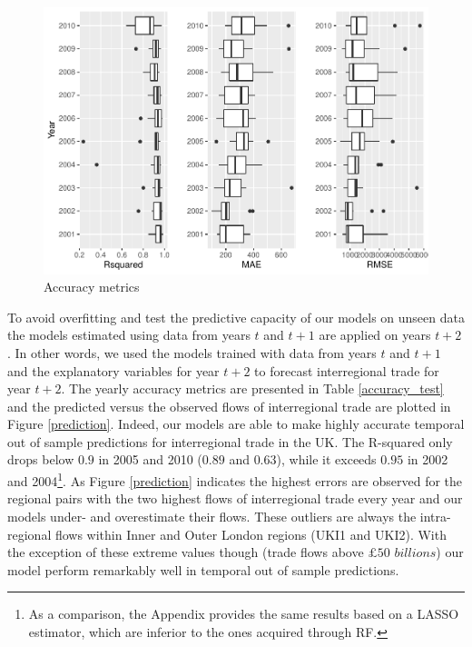 \documentclass[]{interact}
\theoremstyle{plain}%
\theoremstyle{definition}
\theoremstyle{remark}
\begin{document}
\begin{figure}[p]
\includegraphics[width=1\linewidth]{hl_v2--and-_files/figure-latex/unnamed-chunk-3-1} \caption{\label{accuracy_insample}Accuracy metrics}\label{fig:unnamed-chunk-3}
\end{figure}

To avoid overfitting and test the predictive capacity of our models on
unseen data the models estimated using data from years \(t\) and
\(t + 1\) are applied on years \(t + 2\). In other words, we used the
models trained with data from years \(t\) and \(t + 1\) and the
explanatory variables for year \(t + 2\) to forecast interregional trade
for year \(t + 2\). The yearly accuracy metrics are presented in Table
\ref{accuracy_test} and the predicted versus the observed flows of
interregional trade are plotted in Figure \ref{prediction}. Indeed, our
models are able to make highly accurate temporal out of sample
predictions for interregional trade in the UK. The R-squared only drops
below \(0.9\) in 2005 and 2010 (\(0.89\) and \(0.63\)), while it exceeds
\(0.95\) in 2002 and 2004\footnote{As a comparison, the Appendix
  provides the same results based on a LASSO estimator, which are
  inferior to the ones acquired through RF.}. As Figure \ref{prediction}
indicates the highest errors are observed for the regional pairs with
the two highest flows of interregional trade every year and our models
under- and overestimate their flows. These outliers are always the
intra-regional flows within Inner and Outer London regions (UKI1 and
UKI2). With the exception of these extreme values though (trade flows
above \(\pounds 50\) \(billions\)) our model perform remarkably well in
temporal out of sample predictions.
\end{document}
